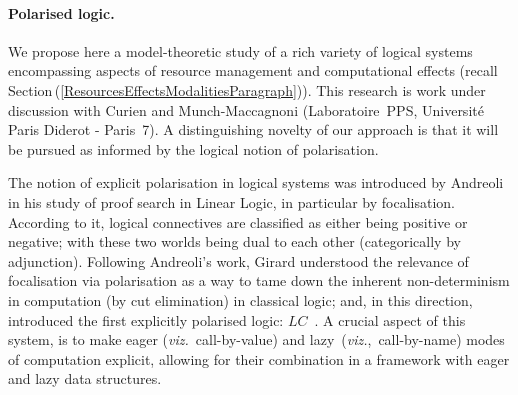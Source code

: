 \documentclass[11pt,twocolumn]{article}
\newcommand{\hide}[1]{}
\newcommand{\pref}[1]{\,(\ref{#1})}
\newcommand{\viz}{\emph{viz.}}
\newcommand{\LC}{\mbox{$LC$}}
\begin{document}
{\hide{
The study of Cohen Forcing for type theory was stated as an open problem
by Beeson~\cite{BeesonBook}, who wrote: ``Forcing has yet to be worked out
directly for Martin-L\"of's system.''.  Work in this direction has only
recently begun.  Specifically, by Coquand and Jaber~\cite{CoquandNote} who
presented an interesting example.  Much remains to be explored both with
respect to the vast literature on set-theoretic forcing and, more
relevantly, with respect to Krivine's Classical
Realizability~\cite{KrivineRA}, an extension of forcing.
}
}

\paragraph{Polarised logic.}
\label{PolarisationParagraph}

We propose here a model-theoretic study of a rich variety of logical
systems encompassing aspects of resource management and computational
effects (recall Section\pref{ResourcesEffectsModalitiesParagraph}).  This
research is work under discussion with Curien and
Munch-Maccagnoni (Laboratoire~PPS, Universit\'e Paris Diderot - Paris~7).
A distinguishing novelty of our approach is that it will be pursued as
informed by the logical notion of polarisation.

The notion of explicit polarisation in logical systems was introduced by
Andreoli~\cite{Andreoli} in his study of proof search in Linear Logic, in
particular by focalisation.  According to it, logical connectives are
classified as either being positive or negative; with these two worlds
being dual to each other (categorically by adjunction).  Following
Andreoli's work, Girard understood the relevance of focalisation via
polarisation as a way to tame down the inherent non-determinism in
computation (by cut elimination) in classical logic; and, in this
direction, introduced the first explicitly polarised logic:
\LC~\cite{GirardLC}.  A crucial aspect of this system, is to make eager
(\viz~call-by-value) and lazy~(\viz,~call-by-name) modes of computation
explicit, allowing for their combination in a framework with eager and
lazy data structures.
\end{document}
